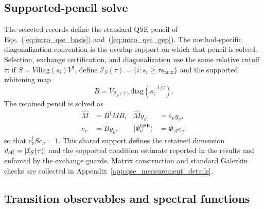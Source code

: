 \documentclass[
  reprint,
  amsmath,
  amssymb,
  aps,
  pra,
  nofootinbib,
  superscriptaddress,
  floatfix
]{revtex4-2}
\newcommand{\Acal}{\mathcal{A}}
\newcommand{\qse}{\mathrm{QSE}}
\newcommand{\diag}{\mathrm{diag}}
\newcommand{\ket}[1]{|#1\rangle}
\begin{document}
\subsection{Supported-pencil solve}

The selected records define the standard QSE pencil of Eqs.~(\ref{eq:intro_qse_basis}) and~(\ref{eq:intro_qse_gep}).  The method-specific diagonalization convention is the overlap support on which that pencil is solved.  Selection, exchange certification, and diagonalization use the same relative cutoff $\tau$: if $S=V\diag(s_i)V^\dagger$, define
$\mathcal I_S(\tau)=\{i:s_i\ge\tau s_{\max}\}$ and the supported whitening map
\begin{equation}
B
=
V_{\mathcal I_S(\tau)}
\diag(s_i^{-1/2}) .
\label{eq:qse_metric_whitening}
\end{equation}
The retained pencil is solved as
\begin{equation}
\begin{aligned}
\widehat M
&=B^\dagger MB,
&
\widehat M y_\nu&=\varepsilon_\nu y_\nu,\\
c_\nu&=By_\nu,
&
\ket{\Psi_\nu^{\qse}}&=\Phi_\Acal c_\nu.
\end{aligned}
\label{eq:qse_whitened_gep}
\end{equation}
so that \(c_\nu^\dagger S c_\nu=1\).  This shared support defines the
retained dimension $d_{\rm eff}=|\mathcal I_S(\tau)|$ and the supported
condition estimate reported in the results and enforced by the exchange
guards.  Matrix construction and standard Galerkin checks are collected in
Appendix~\ref{app:qse_measurement_details}.

\subsection{Transition observables and spectral functions}
\end{document}
